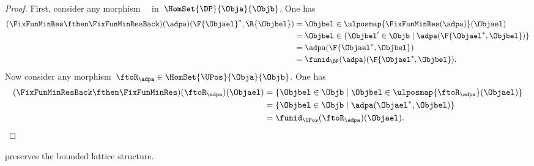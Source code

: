 \begin{proof}
	First, consider any morphism~~ in~$\HomSet{\DP}{\Obja}{\Objb}$.
	One has
	\begin{equation*}
		\begin{aligned}
			(\FixFunMinRes \fthen \FixFunMinResBack)(\adpa)(\F{\Objael}^*,\R{\Objbel})
			 & = \Objbel \in \ulposmap{\FixFunMinRes(\adpa)}(\Objael)                 \\
			 & =\Objbel \in \{ \Objbel' \in \Objb \mid \adpa(\F{\Objael^*,\Objbel})\} \\
			 & =\adpa(\F{\Objael^*,\Objbel})                                          \\
			 & =\funid_\DP(\adpa)(\F{\Objael^*,\Objbel}).
		\end{aligned}
	\end{equation*}
	Now consider any morphism~$\ftoR_\adpa \in \HomSet{\UPos}{\Obja}{\Objb}$.
	One has
	\begin{equation*}
		\begin{aligned}
			(\FixFunMinResBack \fthen \FixFunMinRes)(\ftoR_\adpa)(\Objael)
			 & =\{ \Objbel \in \Objb\mid \Objbel \in \ulposmap{\ftoR_\adpa}(\Objael)\} \\
			 & =\{ \Objbel \in \Objb\mid \adpa(\Objael^*,\Objbel)\}                    \\
			 & =\funid_\UPos(\ftoR_\adpa)(\Objael).
		\end{aligned}
	\end{equation*}

\end{proof}
\begin{lemma}
	\FixFunMinRes preserves the bounded lattice structure.
\end{lemma}
